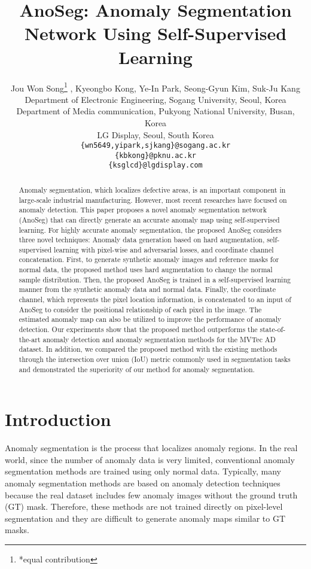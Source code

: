 \documentclass{article} \usepackage{iclr2022_conference,times}
\title{AnoSeg: Anomaly Segmentation Network Using Self-Supervised Learning}
\author{Jou Won Song{}\thanks{*equal contribution} , Kyeongbo Kong{}, Ye-In Park{}, Seong-Gyun Kim{}, Suk-Ju Kang{} \\
{}Department of Electronic Engineering, Sogang University, Seoul, Korea\\
{}Department of Media communication, Pukyong National University, Busan, Korea\\
{}LG Display, Seoul, South Korea\\
\texttt{\{wn5649,yipark,sjkang\}@sogang.ac.kr}{} \\
\texttt{\{kbkong\}@pknu.ac.kr}{} \\
\texttt{\{ksglcd\}@lgdisplay.com}{} \\


}
\begin{document}
\maketitle

\begin{abstract}
Anomaly segmentation, which localizes defective areas, is an important component in large-scale industrial manufacturing. However, most recent researches have focused on anomaly detection. This paper proposes a novel anomaly segmentation network (AnoSeg) that can directly generate an accurate anomaly map using self-supervised learning. For highly accurate anomaly segmentation, the proposed AnoSeg considers three novel techniques: Anomaly data generation based on hard augmentation, self-supervised learning with pixel-wise and adversarial losses, and coordinate channel concatenation. First, to generate synthetic anomaly images and reference masks for normal data, the proposed method uses hard augmentation to change the normal sample distribution. Then, the proposed AnoSeg is trained in a self-supervised learning manner from the synthetic anomaly data and normal data. Finally, the coordinate channel, which represents the pixel location information, is concatenated to an input of AnoSeg to consider the positional relationship of each pixel in the image. The estimated anomaly map can also be utilized to improve the performance of anomaly detection. Our experiments show that the proposed method outperforms the state-of-the-art anomaly detection and anomaly segmentation methods for the MVTec AD dataset. In addition, we compared the proposed method with the existing methods through the intersection over union (IoU) metric commonly used in segmentation tasks and demonstrated the superiority of our method for anomaly segmentation.
\end{abstract}

\section{Introduction}



Anomaly segmentation is the process that localizes anomaly regions. In the real world, since the number of anomaly data is very limited, conventional anomaly segmentation methods are trained using only normal data. Typically, many anomaly segmentation methods are based on anomaly detection techniques because the real dataset includes few anomaly images without the ground truth (GT) mask. Therefore, these methods are not trained directly on pixel-level segmentation and they are difficult to generate anomaly maps similar to GT masks.
\end{document}
